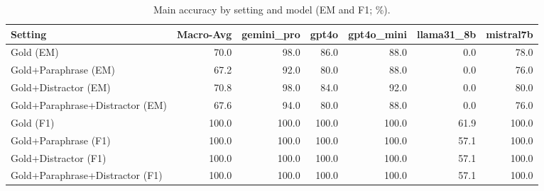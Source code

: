 \begin{table}[t]\centering
\caption{Main accuracy by setting and model (EM and F1; \%).}
\label{tab:main-accuracy}
\begin{tabular}{lrrrrrr}
\toprule
Setting & Macro-Avg & gemini_pro & gpt4o & gpt4o_mini & llama31_8b & mistral7b \\
\midrule
Gold (EM) & 70.0 & 98.0 & 86.0 & 88.0 & 0.0 & 78.0 \\
Gold+Paraphrase (EM) & 67.2 & 92.0 & 80.0 & 88.0 & 0.0 & 76.0 \\
Gold+Distractor (EM) & 70.8 & 98.0 & 84.0 & 92.0 & 0.0 & 80.0 \\
Gold+Paraphrase+Distractor (EM) & 67.6 & 94.0 & 80.0 & 88.0 & 0.0 & 76.0 \\
Gold (F1) & 100.0 & 100.0 & 100.0 & 100.0 & 61.9 & 100.0 \\
Gold+Paraphrase (F1) & 100.0 & 100.0 & 100.0 & 100.0 & 57.1 & 100.0 \\
Gold+Distractor (F1) & 100.0 & 100.0 & 100.0 & 100.0 & 57.1 & 100.0 \\
Gold+Paraphrase+Distractor (F1) & 100.0 & 100.0 & 100.0 & 100.0 & 57.1 & 100.0 \\
\bottomrule
\end{tabular}
\end{table}
